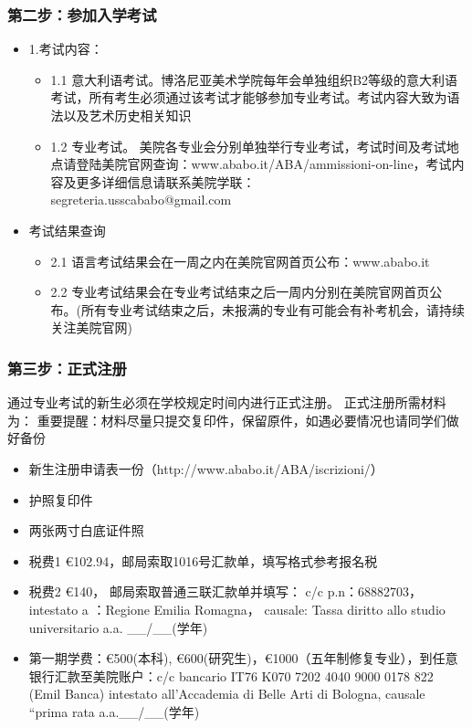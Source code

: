 \subsubsection{第二步：参加入学考试}
\begin{itemize}
  \item  1.考试内容：
    \begin{itemize}
      \item  1.1 意大利语考试。博洛尼亚美术学院每年会单独组织B2等级的意大利语考试，所有考生必须通过该考试才能够参加专业考试。考试内容大致为语法以及艺术历史相关知识
      \item  1.2 专业考试。 美院各专业会分别单独举行专业考试，考试时间及考试地点请登陆美院官网查询：www.ababo.it/ABA/ammissioni-on-line，考试内容及更多详细信息请联系美院学联：\\
      segreteria.usscababo@gmail.com
    \end{itemize}
  \item  考试结果查询
     \begin{itemize}
      \item  2.1 语言考试结果会在一周之内在美院官网首页公布：www.ababo.it
      \item  2.2 专业考试结果会在专业考试结束之后一周内分别在美院官网首页公布。(所有专业考试结束之后，未报满的专业有可能会有补考机会，请持续关注美院官网)
    \end{itemize}
 \end{itemize}


\subsubsection{第三步：正式注册}
通过专业考试的新生必须在学校规定时间内进行正式注册。
正式注册所需材料为：
重要提醒：材料尽量只提交复印件，保留原件，如遇必要情况也请同学们做好备份

\begin{itemize}
  \item 新生注册申请表一份（http://www.ababo.it/ABA/iscrizioni/）
  \item 护照复印件
  \item 两张两寸白底证件照
  \item 税费1 €102.94，邮局索取1016号汇款单，填写格式参考报名税
  \item 税费2 €140， 邮局索取普通三联汇款单并填写：                                                              c/c p.n：68882703，intestato a ：Regione Emilia Romagna， causale: Tassa diritto allo studio universitario a.a. \_\_/\_\_(学年)
  \item 第一期学费：€500(本科), €600(研究生)，€1000（五年制修复专业），到任意银行汇款至美院账户：c/c bancario IT76 K070 7202 4040 9000 0178 822 (Emil Banca) intestato all’Accademia di Belle Arti di Bologna, causale “prima rata a.a.\_\_/\_\_(学年)
 \end{itemize}

